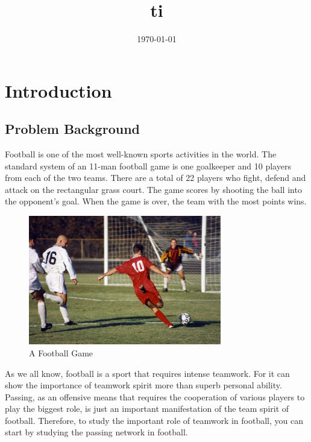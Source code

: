 \documentclass{mcmthesis}
\begin{document}
\linespread{0.6} %
\setlength{\parskip}{0.5\baselineskip} %
\title{ti}

\date{\today}
	\begin{abstract}

	
		\begin{keywords}
		
		\end{keywords}
	\end{abstract}

\maketitle

\tableofcontents

\newpage

\section{Introduction}
\subsection{Problem Background}
	Football is one of the most well-known sports activities in the world.  The standard system of an 11-man football game is one goalkeeper and 10 players from each of the two teams. There are a total of 22 players who fight, defend and attack on the rectangular grass court.  The game scores by shooting the ball into the opponent's goal. When the game is over, the team with the most points wins.

	\begin{figure}[h]
		\centering
		\includegraphics[width=0.75\textwidth]{figures/football.jpg}
		\caption{A Football Game~\cite{Wiki_Football}}
		\label{fig:football}
	\end{figure}

	As we all know, football is a sport that requires intense teamwork.  For it can show the importance of teamwork spirit more than superb personal ability.  Passing, as an offensive means that requires the cooperation of various players to play the biggest role, is just an important manifestation of the team spirit of football.  Therefore, to study the important role of teamwork in football, you can start by studying the passing network in football.
\end{document}
